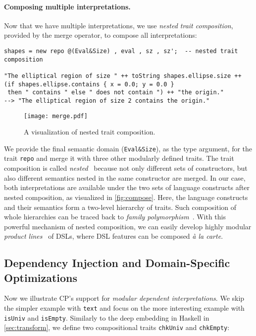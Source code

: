 \paragraph{Composing multiple interpretations.}
Now that we have multiple interpretations, we use \emph{nested trait composition},
provided by the merge operator, to compose all interpretations:

\begin{lstlisting}
shapes = new repo @(Eval&Size) , eval , sz , sz';  -- nested trait composition

"The elliptical region of size " ++ toString shapes.ellipse.size ++
(if shapes.ellipse.contains { x = 0.0; y = 0.0 }
 then " contains " else " does not contain ") ++ "the origin."
--> "The elliptical region of size 2 contains the origin."
\end{lstlisting}

\begin{figure}
  \texttt{[image: merge.pdf]}
  \caption{A visualization of nested trait composition.} \label{fig:compose}
\end{figure}

\noindent
We provide the final semantic domain (\lstinline{Eval&Size}), as the type
argument, for the trait \lstinline{repo} and merge it with three other modularly
defined traits. The trait composition is called
\emph{nested}~\citep{bi2018essence} because not only different sets of
constructors, but also different semantics nested in the same constructor are
merged. In our case, both interpretations are available under the two sets of
language constructs after nested composition, as visualized in
\autoref{fig:compose}. Here, the language constructs and their semantics form a
two-level hierarchy of traits. Such composition of whole hierarchies can be
traced back to \emph{family polymorphism}~\citep{ernst2001family}. With this
powerful mechanism of nested composition, we can easily develop highly modular
\emph{product lines}~\citep{apel2013feature} of DSLs, where DSL features can be
composed \emph{à la carte}.

\subsection{Dependency Injection and Domain-Specific Optimizations} \label{sec:deps}

Now we illustrate CP's support for \emph{modular dependent interpretations}. We
skip the simpler example with \lstinline{text} and focus on the more interesting
example with \lstinline{isUniv} and \lstinline{isEmpty}. Similarly to the deep
embedding in Haskell in \autoref{sec:transform}, we define two compositional
traits \lstinline{chkUniv} and \lstinline{chkEmpty}:

